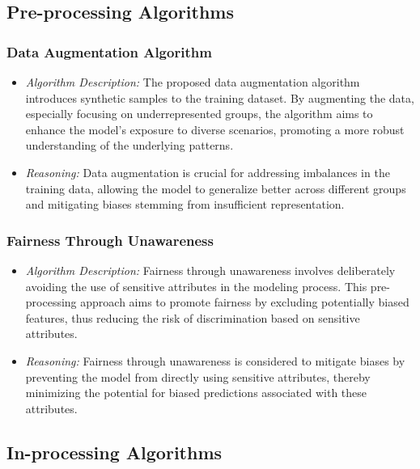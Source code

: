 \subsection{Pre-processing Algorithms}

\subsubsection{Data Augmentation Algorithm}

\begin{itemize}

    \item \emph{Algorithm Description:} The proposed data augmentation algorithm introduces synthetic samples to the training dataset. By augmenting the data, especially focusing on underrepresented groups, the algorithm aims to enhance the model's exposure to diverse scenarios, promoting a more robust understanding of the underlying patterns.

    \item \emph{Reasoning:} Data augmentation is crucial for addressing imbalances in the training data, allowing the model to generalize better across different groups and mitigating biases stemming from insufficient representation.

\end{itemize}

\subsubsection{Fairness Through Unawareness}

\begin{itemize}

    \item \emph{Algorithm Description:} Fairness through unawareness involves deliberately avoiding the use of sensitive attributes in the modeling process. This pre-processing approach aims to promote fairness by excluding potentially biased features, thus reducing the risk of discrimination based on sensitive attributes.

    \item \emph{Reasoning:} Fairness through unawareness is considered to mitigate biases by preventing the model from directly using sensitive attributes, thereby minimizing the potential for biased predictions associated with these attributes.

\end{itemize}

\subsection{In-processing Algorithms}

